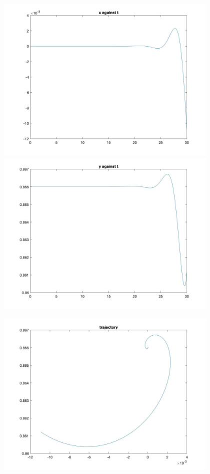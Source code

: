 \documentclass[11pt]{article}
\begin{document}
\begin{figure}[H]
\includegraphics[width = 12cm, height = 8cm]{Q5(13).jpg}
\includegraphics[width = 12cm, height = 8cm]{Q5(14).jpg}
\end{figure}
\begin{figure}[H]
\includegraphics[width = 12cm, height = 8cm]{Q5(15).jpg}
\end{figure}
\end{document}
